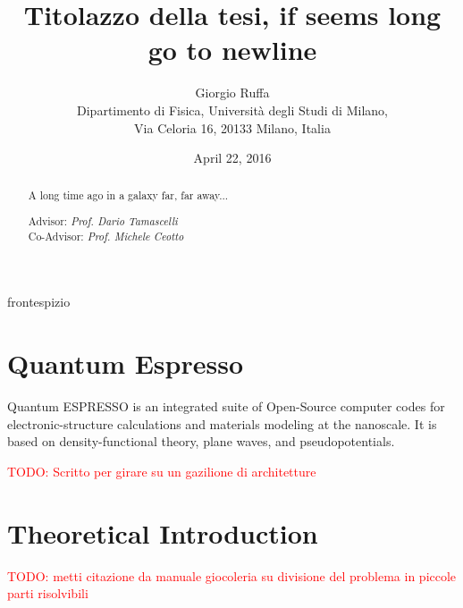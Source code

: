 \documentclass[a4paper,12pt]{article}
\newcommand\mynotes[1]{\begin{flushright}\textcolor{red}{TODO: #1}\end{flushright}}
\begin{document}
\title{\bf \Huge Titolazzo della tesi, if seems long\\go to newline }


\author{Giorgio Ruffa\\
Dipartimento di Fisica, Universit\`a degli Studi di Milano,\\
Via Celoria 16, 20133 Milano, Italia
}
\date{April 22, 2016} %


 {frontespizio} %

\newpage\qquad
\newpage

\maketitle

\begin{abstract}

A long time ago in a galaxy far, far away...

\vskip0.75cm
\hskip5cm
\parbox[t]{7cm}
{
Advisor: {\it Prof. Dario Tamascelli}\\
Co-Advisor: {\it Prof. Michele Ceotto}
}
\end{abstract}

\newpage
\tableofcontents
\newpage

\section{Quantum Espresso}

Quantum ESPRESSO is an integrated suite of Open-Source computer codes for electronic-structure calculations and materials modeling at the nanoscale.
It is based on density-functional theory, plane waves, and pseudopotentials.

\mynotes{Scritto per girare su un gazilione di architetture}

\section{Theoretical Introduction}\label{model:sec}
\mynotes{metti citazione da manuale giocoleria su divisione del problema in piccole parti risolvibili}
\end{document}
